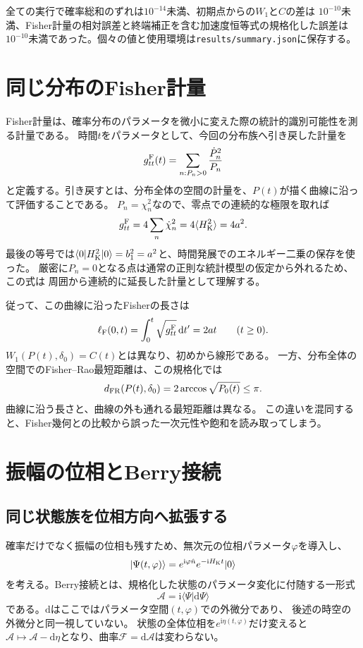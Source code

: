 \documentclass[a4paper,11pt]{ltjsarticle}
\numberwithin{equation}{section}
\newcommand{\ket}[1]{\lvert #1\rangle}
\newcommand{\bra}[1]{\langle #1\rvert}
\newcommand{\avg}[1]{\langle #1\rangle}
\newcommand{\dd}{\mathrm{d}}
\newcommand{\ii}{\mathrm{i}}
\begin{document}
全ての実行で確率総和のずれは$10^{-14}$未満、初期点からの$W_1$と$C$の差は
$10^{-10}$未満、Fisher計量の相対誤差と終端補正を含む加速度恒等式の規格化した誤差は
$10^{-10}$未満であった。個々の値と使用環境は\texttt{results/summary.json}に保存する。

\section{同じ分布のFisher計量}
Fisher計量は、確率分布のパラメータを微小に変えた際の統計的識別可能性を測る計量である。
時間$t$をパラメータとして、今回の分布族へ引き戻した計量を
\begin{equation}
 g^{\rm F}_{tt}(t)=\sum_{n:P_n>0}\frac{\dot P_n^2}{P_n}
 \label{eq:fisherdef}
\end{equation}
と定義する。引き戻すとは、分布全体の空間の計量を、$P(t)$が描く曲線に沿って評価することである。
$P_n=\chi_n^2$なので、零点での連続的な極限を取れば
\begin{equation}
 g^{\rm F}_{tt}=4\sum_n\dot\chi_n^2
 =4\avg{H_{\rm K}^2}=4a^2.
 \label{eq:fisherconstant}
\end{equation}
最後の等号では$\bra0H_{\rm K}^2\ket0=b_1^2=a^2$と、時間発展でのエネルギー二乗の保存を使った。
厳密に$P_n=0$となる点は通常の正則な統計模型の仮定から外れるため、この式は
周囲から連続的に延長した計量として理解する。

従って、この曲線に沿ったFisherの長さは
\begin{equation}
 \ell_{\rm F}(0,t)=\int_0^t\sqrt{g^{\rm F}_{tt}}\,\dd t'=2at\qquad(t\geq0).
 \label{eq:fisherlength}
\end{equation}
$W_1(P(t),\delta_0)=C(t)$とは異なり、初めから線形である。
一方、分布全体の空間でのFisher--Rao最短距離は、この規格化では
\begin{equation}
 d_{\rm FR}(P(t),\delta_0)=2\arccos\sqrt{P_0(t)}\leq\pi.
 \label{eq:ambientfr}
\end{equation}
曲線に沿う長さと、曲線の外も通れる最短距離は異なる。
この違いを混同すると、Fisher幾何との比較から誤った一次元性や飽和を読み取ってしまう。

\section{振幅の位相とBerry接続}
\subsection{同じ状態族を位相方向へ拡張する}
確率だけでなく振幅の位相も残すため、無次元の位相パラメータ$\varphi$を導入し、
\begin{equation}
 \ket{\Psi(t,\varphi)}=e^{\ii\varphi\hat n}e^{-\ii H_{\rm K}t}\ket0
 \label{eq:phasefamily}
\end{equation}
を考える。Berry接続とは、規格化した状態のパラメータ変化に付随する一形式
\begin{equation}
 \mathcal A=\ii\bra\Psi\dd\Psi\rangle
 \label{eq:berrydef}
\end{equation}
である。$\dd$はここではパラメータ空間$(t,\varphi)$での外微分であり、
後述の時空の外微分と同一視していない。
状態の全体位相を$e^{\ii\eta(t,\varphi)}$だけ変えると
$\mathcal A\mapsto\mathcal A-\dd\eta$となり、曲率$\mathcal F=\dd\mathcal A$は変わらない。
\end{document}
